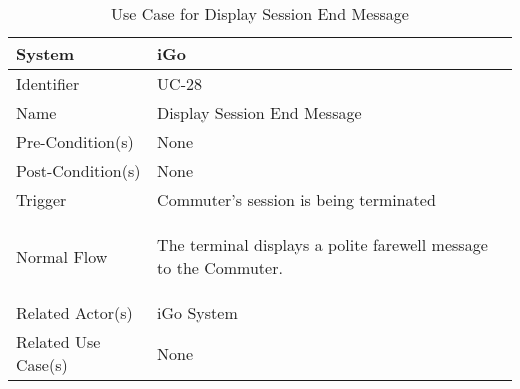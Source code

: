 \begin{table}[ht]
    \centering
    \begin{tabular}{|l|p{11cm}|}
         \hline
         System             & iGo\\
         \hline
         Identifier         & UC-28 \\
         \hline
         Name               & Display Session End Message \\
         \hline
         Pre-Condition(s)   & None \\
         \hline
         Post-Condition(s)  & None\\
         \hline
         Trigger            & Commuter's session is being terminated \\
         \hline
         Normal Flow        & 
         \begin{enumerate*}[itemjoin=\newline]
            \item The terminal displays a polite farewell message to the Commuter. 
         \end{enumerate*} \\
         \hline
         Related Actor(s)   & iGo System \\
         \hline
         Related Use Case(s)& None\\
         \hline
    \end{tabular}
    \caption{Use Case for Display Session End Message}
    \label{tab:UC_DisplaySessionEndMessage}
\end{table}
